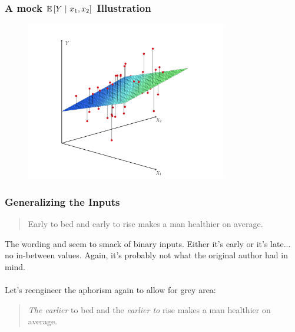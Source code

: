 \documentclass[handout]{beamer}
\begin{document}
\begin{frame}\frametitle{A mock $\mathbb{E}\left[Y~|~x_1, x_2\right]$ Illustration}

\begin{figure}
\centering
\includegraphics[width=3.45in]{cef.png}
\end{figure}
	
\end{frame}

\begin{frame}\frametitle{Generalizing the Inputs}

\begin{quotation}
Early to bed and early to rise makes a man healthier on average.
\end{quotation}

The wording  and  seem to smack of  \pause binary inputs. Either it's early or it's late... no in-between values.  \pause Again, it's probably not what the original author had in mind.\\~\\ %

Let's reengineer the aphorism again to allow for grey area: \pause 

\begin{quotation}
\emph{The earlier} to bed and the \emph{earlier to} rise makes a man healthier on average.
\end{quotation}

\end{frame}
\end{document}
